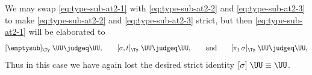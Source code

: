 \documentclass[a4paper,UKenglish,numberwithinsect,cleveref,thm-restate]{lipics-v2021}
\begin{document}
We may swap \eqref{eq:type-sub-at2-1} with \eqref{eq:type-sub-at2-2} and \eqref{eq:type-sub-at2-3} to make \eqref{eq:type-sub-at2-2} and \eqref{eq:type-sub-at2-3} strict, but then \eqref{eq:type-sub-at2-1} will be elaborated to 
\[
[ \emptysub ]_{\Ty}\;\UU         \judgeq \UU, \qquad
[ \sigma, t ]_{\Ty}\;\UU         \judgeq \UU, \qquad\text{and}\qquad 
[ \pi_1\,\sigma ]_{\Ty}\;\UU     \judgeq \UU,
\]
Thus in this case we have again lost the desired strict identity $[\sigma]\;\UU \equiv \UU$.
%
\end{document}
